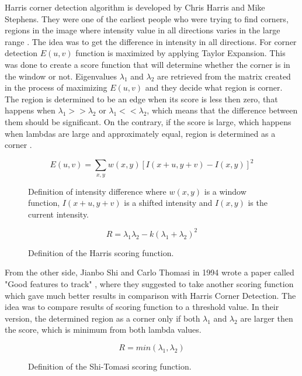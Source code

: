 \documentclass[../../../../main]{subfiles}
\begin{document}
Harris corner detection algorithm is developed by Chris Harris and Mike Stephens. They were one of the earliest people who were trying to find corners, regions in the image where intensity value in all directions varies in the large range \cite{opencv_docs_harris_corners_1}. The idea was to get the difference in intensity in all directions. For corner detection $E(u,v)$ function is maximized by applying Taylor Expansion. This was done to create a score function that will determine whether the corner is in the window or not. Eigenvalues $\lambda_1$ and $\lambda_2$ are retrieved from the matrix created in the process of maximizing $E(u,v)$ and they decide what region is corner. The region is determined to be an edge when its score is less then zero, that happens when $\lambda_1>>\lambda_2$ or $\lambda_1<<\lambda_2$, which means that the difference between them should be significant. On the contrary, if the score is large, which happens when lambdas are large and approximately equal, region is determined as a corner \cite{opencv_docs_harris_corners_2}.

\begin{figure} [!ht]
  \centering    
    \begin{equation}
        E(u,v) = \sum_{x,y} w(x,y) [I(x+u,y+v) - I(x,y)]^2
    \end{equation}
  \caption{Definition of intensity difference where $w(x,y)$ is a window function, $I(x+u,y+v)$ is a shifted intensity and $I(x,y)$ is the current intensity.}
\end{figure}

\begin{figure} [!ht]
  \centering    
    \begin{equation}
        R = \lambda_1\lambda_2 - k(\lambda_1+\lambda_2)^2
    \end{equation}
  \caption{Definition of the Harris scoring function.}
\end{figure}

From the other side, Jianbo Shi and Carlo Thomasi in 1994 wrote a paper called "Good features to track" \cite{good_feature_to_track_shi_tomasi}, where they suggested to take another scoring function which gave much better results in comparison with Harris Corner Detection. The idea was to compare results of scoring function to a threshold value. In their version, the determined region as a corner only if both $\lambda_1$ and $\lambda_2$ are larger then the score, which is minimum from both lambda values.

\begin{figure} [!ht]
  \centering    
    \begin{equation}
        R = min(\lambda_1,\lambda_2)
    \end{equation}
  \caption{Definition of the Shi-Tomasi scoring function.}
\end{figure}
\end{document}
